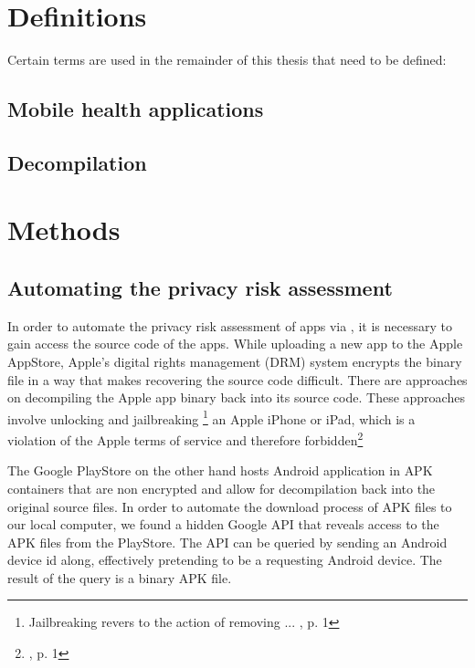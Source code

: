 \documentclass[
	a4paper,
	oneside,
	12pt,
	liststotocnumbered
]{article}
\let\cite\textcite
\begin{document}
\section{Definitions}
Certain terms are used in the remainder of this thesis that need to be defined:

\subsection{Mobile health applications}

\subsection{\Sca}

\subsection{Decompilation}


\section{Methods}

\subsection{Automating the privacy risk assessment}

In order to automate the privacy risk assessment of \mH apps via \sca, it is necessary to gain access the source code of the apps. 
While uploading a new app to the Apple AppStore, Apple's digital rights management (\acs{DRM}) system encrypts the binary file in a way that makes recovering the source code difficult. 
There are approaches on decompiling the Apple app binary back into its source code.
These approaches involve unlocking and jailbreaking
\footnote{Jailbreaking revers to the action of removing ... \cite{Kweller2010}, p. 1}
an Apple iPhone or iPad, which is a violation of the Apple terms of service and therefore forbidden\footnote{\cite{Kweller2010}, p. 1}

The Google PlayStore on the other hand hosts Android application in \acs{APK} containers that are non encrypted and allow for decompilation back into the original source files. 
In order to automate the download process of \acs{APK} files to our local computer, we found a hidden Google \acs{API} that reveals access to the \acs{APK} files from the PlayStore. 
The \acs{API} can be queried by sending an Android device id along, effectively pretending to be a requesting Android device.
The result of the query is a binary \acs{APK} file.
\end{document}
